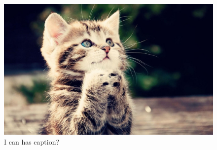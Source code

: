 \begin{figure}
   \begin{center}
   \includegraphics[width=147.50mm]{figures/CWL/figure.jpg}
   \end{center}
\caption[Figure title]{ \label{fig:figurelabel} 
I can has caption?}
\end{figure} 